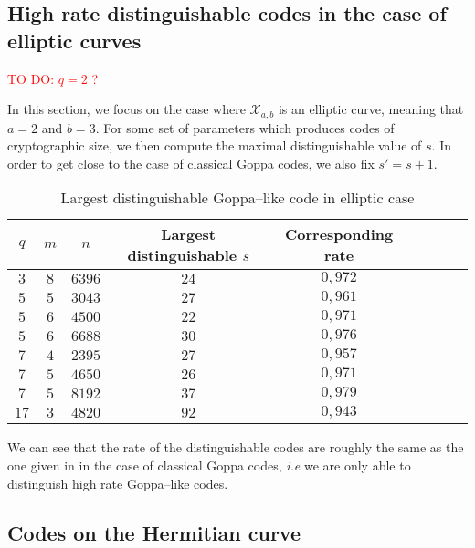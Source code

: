 \documentclass[a4paper]{article}
\theoremstyle{definition}
\theoremstyle{remark}
\newcommand{\calX}{\mathcal{X}}
\newcommand\TODO[1]{\textcolor{red}{TO DO: #1}}
\begin{document}
\subsection{High rate distinguishable codes in the case of elliptic curves}

\TODO{$q=2$ ?}

In this section, we focus on the case where $\calX_{a,b}$ is an elliptic curve, meaning that $a=2$ and $b=3$. For some set of parameters which produces codes of cryptographic size, we then compute the maximal distinguishable value of $s$. In order to get close to the case of classical Goppa codes, we also fix $s'=s+1$.

\begin{table}[h]
\begin{center}
\begin{tabular}{|c|c|c||c|c|c|c|c|c|}
    \hline
    $q$ & $m$ & $n$ & Largest distinguishable $s$ & Corresponding rate\\
    \hline
     $3$ & $8$ & $6396$ & $24$ & $0,972$ \\
    \hline \hline
     $5$ & $5$ & $3043$ & $27$ & $0,961$  \\
    \hline
     $5$ & $6$ & $4500$ & $22$ & $0,971$ \\
    \hline
     $5$  & $6$ & $6688$ & $30$ & $0,976$ \\
    \hline \hline
     $7$ & $4$ & $2395$ & $27$ & $0,957$ \\
    \hline
      $7$ & $5$ & $4650$ & $26$ & $0,971$ \\
    \hline
      $7$ & $5$ & $8192$ & $37$ & $0,979$ \\
    \hline \hline
      $17$ & $3$ & $4820$ & $92$ & $0,943$ \\
    \hline
\end{tabular}
\caption{Largest distinguishable Goppa--like code in elliptic case}
\end{center}
\end{table}

We can see that the rate of the distinguishable codes are roughly the same as the one given in \cite{MT21} in the case of classical Goppa codes, \emph{i.e} we are only able to distinguish high rate Goppa--like codes.



\subsection{Codes on the Hermitian curve}
\end{document}
